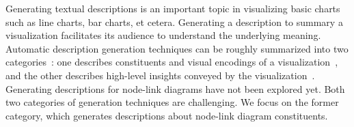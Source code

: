 Generating textual descriptions is an important topic in visualizing basic charts such as line charts, bar charts, et cetera.
Generating a description to summary a visualization facilitates its audience to understand the underlying meaning.
Automatic description generation techniques can be roughly summarized into two categories~\cite{DBLP:conf/inlg/ObeidH20}: one describes constituents and visual encodings of a visualization~\cite{DBLP:journals/coling/MittalMCR98, DBLP:journals/tochi/FerresLST13}, and the other describes high-level insights conveyed by the visualization~\cite{DBLP:conf/apvis/LiuXHWY20, DBLP:conf/inlg/ObeidH20}.
Generating descriptions for node-link diagrams have not been explored yet.
Both two categories of generation techniques are challenging.
We focus on the former category, which generates descriptions about node-link diagram constituents.


